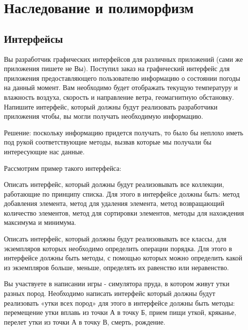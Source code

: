 \section{Наследование и полиморфизм}

\subsection{Интерфейсы}

Вы разработчик графических интерфейсов для различных приложений (сами
же приложения пишете не Вы). Поступил заказ на графический интерфейс
для приложения предоставляющего пользователю информацию о состоянии
погоды на данный момент. Вам необходимо будет отображать текущую
температуру и влажность воздуха, скорость и направление ветра,
геомагнитную обстановку. Напишите интерфейс, который должны будут
реализовать разработчики приложения чтобы, вы могли получать
необходимую информацию.

Решение: поскольку информацию придется получать, то было бы неплохо
иметь под рукой соответствующие методы, вызвав которые мы получали бы
интересующие нас данные.

Рассмотрим пример такого интерфейса:



\task Описать интерфейс, который должны будут реализовывать все
коллекции, работающие по принципу списка. Для этого в интерфейсе
должны быть: метод добавления элемента, метод для удаления элемента,
метод возвращающий количество элементов, метод для сортировки
элементов, методы для нахождения максимума и минимума.

\task Описать интерфейс, который должны будут реализовывать все
классы, для экземпляров которых необходимо определить операции
порядка. Для этого в интерфейсе должны быть методы, с помощью которых
можно определить какой из экземпляров больше, меньше, определять их
равенство или неравенство.

\task Вы участвуете в написании игры - симулятора пруда, в котором
живут утки разных пород. Необходимо написать интерфейс который должны
будут реализовать «утки всех пород» для этого в интерфейсе должны быть
методы: перемещение утки вплавь из точки А в точку Б, прием пищи
уткой, кряканье, перелет утки из точки А в точку В, смерть, рождение.

